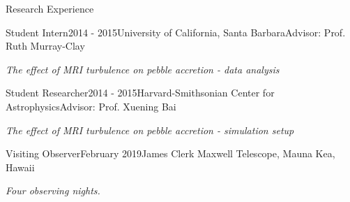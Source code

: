\documentclass{resume} %
\begin{document}
\begin{rSection}{Research Experience}
\begin{rSubsection}{Student Intern}{2014 - 2015}{University of California, Santa Barbara}{Advisor: Prof. Ruth Murray-Clay}
\item \emph{{The effect of MRI turbulence on pebble accretion - data analysis}} 
\end{rSubsection}

\begin{rSubsection}{Student Researcher}{2014 - 2015}{Harvard-Smithsonian Center for Astrophysics}{Advisor: Prof. Xuening Bai}
\item \emph{{The effect of MRI turbulence on pebble accretion - simulation setup}} 
\end{rSubsection}




\begin{rSubsection}{Visiting Observer}{February 2019}{James Clerk Maxwell Telescope, Mauna Kea, Hawaii}{}
\item \emph{Four observing nights.}
\end{rSubsection}

\end{rSection}
\end{document}
